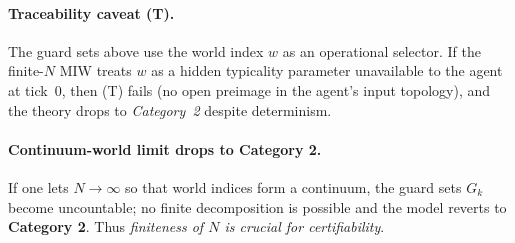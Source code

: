 \documentclass[12pt]{article}
\theoremstyle{definition}
\theoremstyle{plain}
\begin{document}
\paragraph{Traceability caveat (T).}
The guard sets above use the world index $w$ as an operational selector. If the finite-$N$ MIW treats $w$ as a hidden typicality parameter unavailable to the agent at tick~0, then (T) fails (no open preimage in the agent’s input topology), and the theory drops to \emph{Category~2} despite determinism.


\paragraph{Continuum-world limit drops to Category 2.}
If one lets $N\!\to\!\infty$ so that world indices form a continuum,
the guard sets $G_k$ become uncountable; no finite decomposition is
possible and the model reverts to \textbf{Category 2}.  Thus
\emph{finiteness of $N$ is crucial for certifiability}.
\end{document}
